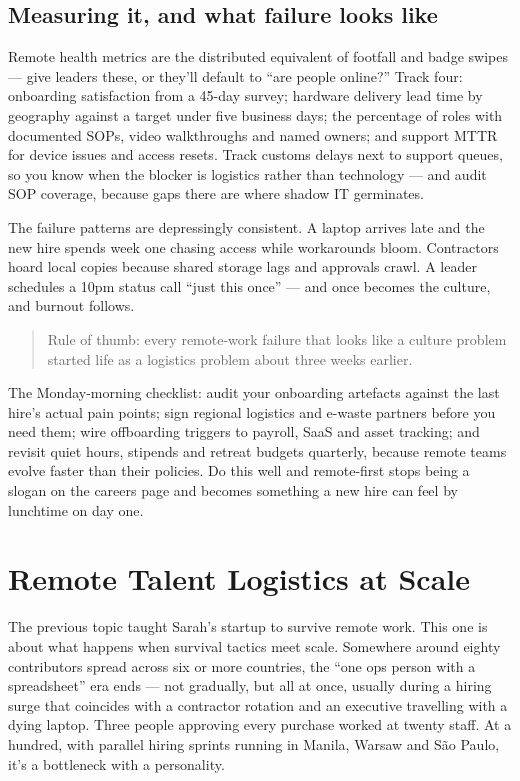 \subsection{Measuring it, and what failure looks like}


Remote health metrics are the distributed equivalent of footfall and badge swipes — give leaders these, or they'll default to ``are people online?'' Track four: onboarding satisfaction from a 45-day survey; hardware delivery lead time by geography against a target under five business days; the percentage of roles with documented SOPs, video walkthroughs and named owners; and support MTTR for device issues and access resets. Track customs delays next to support queues, so you know when the blocker is logistics rather than technology — and audit SOP coverage, because gaps there are where shadow IT germinates.


The failure patterns are depressingly consistent. A laptop arrives late and the new hire spends week one chasing access while workarounds bloom. Contractors hoard local copies because shared storage lags and approvals crawl. A leader schedules a 10pm status call ``just this once'' — and once becomes the culture, and burnout follows.



\begin{quote}\small
Rule of thumb: every remote-work failure that looks like a culture problem started life as a logistics problem about three weeks earlier.
\end{quote}


The Monday-morning checklist: audit your onboarding artefacts against the last hire's actual pain points; sign regional logistics and e-waste partners before you need them; wire offboarding triggers to payroll, SaaS and asset tracking; and revisit quiet hours, stipends and retreat budgets quarterly, because remote teams evolve faster than their policies. Do this well and remote-first stops being a slogan on the careers page and becomes something a new hire can feel by lunchtime on day one.

\section{Remote Talent Logistics at Scale}
The previous topic taught Sarah's startup to survive remote work. This one is about what happens when survival tactics meet scale. Somewhere around eighty contributors spread across six or more countries, the ``one ops person with a spreadsheet'' era ends — not gradually, but all at once, usually during a hiring surge that coincides with a contractor rotation and an executive travelling with a dying laptop. Three people approving every purchase worked at twenty staff. At a hundred, with parallel hiring sprints running in Manila, Warsaw and São Paulo, it's a bottleneck with a personality.


